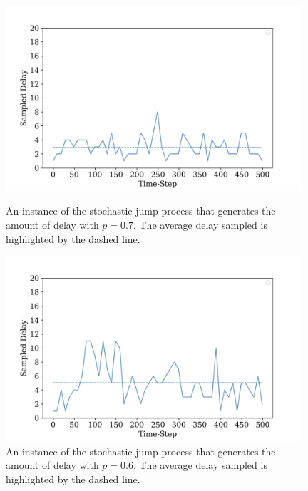                 \begin{figure}[hbtp]
                    \centering
                    \includegraphics[width=11cm]{images/results/delayp07_sampledelay_1.png}
                    \caption{An instance of the stochastic jump process that generates the amount of delay with $p = 0.7$. The average delay sampled is highlighted by the dashed line.}
                    \label{fig:delayp07_sampledelay}
                    
                    \vspace{0.25cm}
                    
                    \centering 
                    \includegraphics[width=11cm]{images/results/delayp06_sampledelay_1.png}
                    \caption{An instance of the stochastic jump process that generates the amount of delay with $p = 0.6$. The average delay sampled is highlighted by the dashed line.}
                    \label{fig:delayp06_sampledelay}
                    
                    \vspace{0.25cm}
                    

\end{figure}
